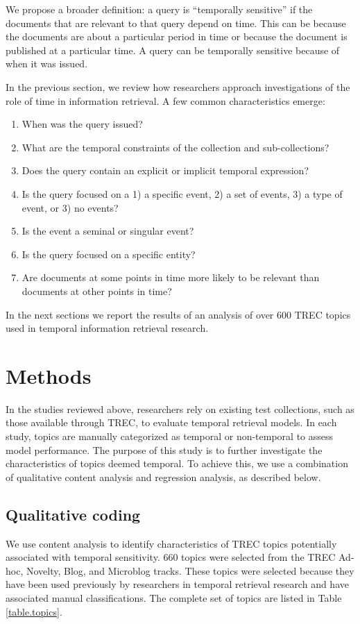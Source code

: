 \documentclass{sig-alternate}
\begin{document}
We propose a broader definition: a query is ``temporally sensitive'' if the documents that are relevant to that query depend on time. This can be because the documents are about a particular period in time or because the document is published at a particular time.  A query can be temporally sensitive because of when it was issued.  

In the previous section, we review how researchers approach investigations of the role of time in information retrieval.  A few common characteristics emerge:

\begin{enumerate}
\item When was the query issued?
\item What are the temporal constraints of the collection and sub-collections?
\item Does the query contain an explicit or implicit temporal expression?
\item Is the query focused on a 1) a specific event, 2) a set of events, 3) a type of event, or 3) no events?
\item Is the event a seminal or singular event?
\item Is the query focused on a specific entity?
\item Are documents at some points in time more likely to be relevant than documents at other points in time?
\end{enumerate}

In the next sections we report the results of an analysis of over 600 TREC topics used in temporal information retrieval research. 

\section{Methods}

In the studies reviewed above, researchers rely on existing test collections, such as those available through TREC, to evaluate temporal retrieval models. In each study, topics are manually categorized as temporal or non-temporal to assess model performance.  The purpose of this study is to further investigate the characteristics of topics deemed temporal. To achieve this, we use a combination of qualitative content analysis and regression analysis, as described below.

\subsection{Qualitative coding}
We use content analysis \cite{Krippendorf1980} to identify characteristics of TREC topics potentially associated with temporal sensitivity. 660 topics were selected from the TREC Ad-hoc, Novelty, Blog, and Microblog tracks. These topics were selected because they have been used previously by researchers in temporal retrieval research and have associated manual classifications.  The complete set of topics are listed in Table \ref{table.topics}.
\end{document}
